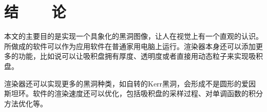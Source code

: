 %
%
%
%
%
%

\chapter*{\vskip 10bp\textmd{结~~~~论} \vskip -6bp}


本文的主要目的是实现一个具象化的黑洞图像，让人在视觉上有一个直观的认识。所做成的软件可以作为应用软件在普通家用电脑上运行。渲染器本身还可以添加更多的功能，比如说可以让吸积盘拥有厚度、透明度或者直接用动态粒子来实现吸积盘。

渲染器还可以实现更多的黑洞种类，如自转的Kerr黑洞，会形成不是圆形的爱因斯坦环。软件的渲染速度还可以优化，包括吸积盘的采样过程、对单调函数的积分方法优化等。
